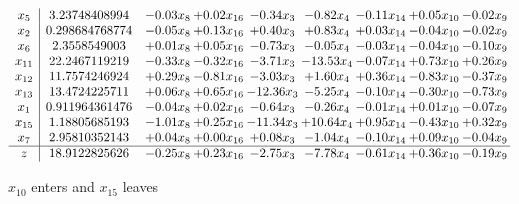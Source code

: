 \documentclass[9pt]{article}
\begin{document}
 \[\begin{array}{c| c c@{\hskip 2pt} c@{\hskip 2pt} c@{\hskip 2pt} c@{\hskip 2pt} c@{\hskip 2pt} c@{\hskip 2pt} c@{\hskip 2pt} }
 x_{5}   &  3.23748408994 & -0.03 x_{8} & +  0.02 x_{16} & -0.34 x_{3} & -0.82 x_{4} & -0.11 x_{14} & +  0.05 x_{10} & -0.02 x_{9}\\
 x_{2}   &  0.298684768774 & -0.05 x_{8} & +  0.13 x_{16} & +  0.40 x_{3} & +  0.83 x_{4} & +  0.03 x_{14} & -0.04 x_{10} & -0.02 x_{9}\\
 x_{6}   &  2.3558549003 & +  0.01 x_{8} & +  0.05 x_{16} & -0.73 x_{3} & -0.05 x_{4} & -0.03 x_{14} & -0.04 x_{10} & -0.10 x_{9}\\
 x_{11}   &  22.2467119219 & -0.33 x_{8} & -0.32 x_{16} & -3.71 x_{3} & -13.53 x_{4} & -0.07 x_{14} & +  0.73 x_{10} & +  0.26 x_{9}\\
 x_{12}   &  11.7574246924 & +  0.29 x_{8} & -0.81 x_{16} & -3.03 x_{3} & +  1.60 x_{4} & +  0.36 x_{14} & -0.83 x_{10} & -0.37 x_{9}\\
 x_{13}   &  13.4724225711 & +  0.06 x_{8} & +  0.65 x_{16} & -12.36 x_{3} & -5.25 x_{4} & -0.10 x_{14} & -0.30 x_{10} & -0.73 x_{9}\\
 x_{1}   &  0.911964361476 & -0.04 x_{8} & +  0.02 x_{16} & -0.64 x_{3} & -0.26 x_{4} & -0.01 x_{14} & +  0.01 x_{10} & -0.07 x_{9}\\
 x_{15}   &  1.18805685193 & -1.01 x_{8} & +  0.25 x_{16} & -11.34 x_{3} & + 10.64 x_{4} & +  0.95 x_{14} & -0.43 x_{10} & +  0.32 x_{9}\\
 x_{7}   &  2.95810352143 & +  0.04 x_{8} & +  0.00 x_{16} & +  0.08 x_{3} & -1.04 x_{4} & -0.10 x_{14} & +  0.09 x_{10} & -0.04 x_{9}\\
\hline
z    &  18.9122825626 & -0.25 x_{8} & +  0.23 x_{16} & -2.75 x_{3} & -7.78 x_{4} & -0.61 x_{14} & +  0.36 x_{10} & -0.19 x_{9}\\
\end{array}\]


 $ x_{10} $ enters and $ x_{15} $ leaves 
\end{document}
